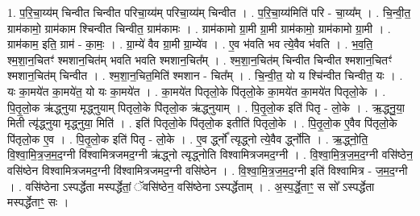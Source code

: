 \documentclass[17pt]{extarticle}
\begin{document}
1. प॒रि॒चा॒य्य॑म् चिन्वीत चिन्वीत परिचा॒य्य॑म् परिचा॒य्य॑म् चिन्वीत । . प॒रि॒चा॒य्य॑मिति॑ परि - चा॒य्य᳚म् । . चि॒न्वी॒त॒ ग्राम॑कामो॒ ग्राम॑काम श्चिन्वीत चिन्वीत॒ ग्राम॑कामः । . ग्राम॑कामो ग्रा॒मी ग्रा॒मी ग्राम॑कामो॒ ग्राम॑कामो ग्रा॒मी । . ग्राम॑काम॒ इति॒ ग्राम॑ - का॒मः॒ । . ग्रा॒म्ये॑ वैव ग्रा॒मी ग्रा॒म्ये॑व । . ए॒व भ॑वति भव त्ये॒वैव भ॑वति । . भ॒व॒ति॒ श्म॒शा॒न॒चितꣳ॑ श्मशान॒चित॑म् भवति भवति श्मशान॒चित᳚म् । . श्म॒शा॒न॒चित॑म् चिन्वीत चिन्वीत श्मशान॒चितꣳ॑ श्मशान॒चित॑म् चिन्वीत । . श्म॒शा॒न॒चित॒मिति॑ श्मशान - चित᳚म् । . चि॒न्वी॒त॒ यो य श्चि॑न्वीत चिन्वीत॒ यः । . यः का॒मये॑त का॒मये॑त॒ यो यः का॒मये॑त । . का॒मये॑त पितृलो॒के पि॑तृलो॒के का॒मये॑त का॒मये॑त पितृलो॒के । . पि॒तृ॒लो॒क ऋ॑द्ध्नुया मृद्ध्नुयाम् पितृलो॒के पि॑तृलो॒क ऋ॑द्ध्नुयाम् । . पि॒तृ॒लो॒क इति॑ पितृ - लो॒के । . ऋ॒द्ध्नु॒या॒ मिती त्यृ॑द्ध्नुया मृद्ध्नुया॒ मिति॑ । . इति॑ पितृलो॒के पि॑तृलो॒क इतीति॑ पितृलो॒के । . पि॒तृ॒लो॒क ए॒वैव पि॑तृलो॒के पि॑तृलो॒क ए॒व । . पि॒तृ॒लो॒क इति॑ पितृ - लो॒के । . ए॒व र्द्ध्नो᳚ त्यृद्ध्नो त्ये॒वैव र्द्ध्नो॑ति । . ऋ॒द्ध्नो॒ति॒ वि॒श्वा॒मि॒त्र॒ज॒म॒द॒ग्नी वि॑श्वामित्रजमद॒ग्नी ऋ॑द्ध्नो त्यृद्ध्नोति विश्वामित्रजमद॒ग्नी । . वि॒श्वा॒मि॒त्र॒ज॒म॒द॒ग्नी वसि॑ष्ठेन॒ वसि॑ष्ठेन विश्वामित्रजमद॒ग्नी वि॑श्वामित्रजमद॒ग्नी वसि॑ष्ठेन । . वि॒श्वा॒मि॒त्र॒ज॒म॒द॒ग्नी इति॑ विश्वामित्र - ज॒म॒द॒ग्नी । . वसि॑ष्ठेना ऽस्पर्द्धेता मस्पर्द्धेतां॒ ॅवसि॑ष्ठेन॒ वसि॑ष्ठेना ऽस्पर्द्धेताम् । . अ॒स्प॒र्द्धे॒ताꣳ॒॒ स सो᳚ ऽस्पर्द्धेता मस्पर्द्धेताꣳ॒॒ सः । \newline
\end{document}
